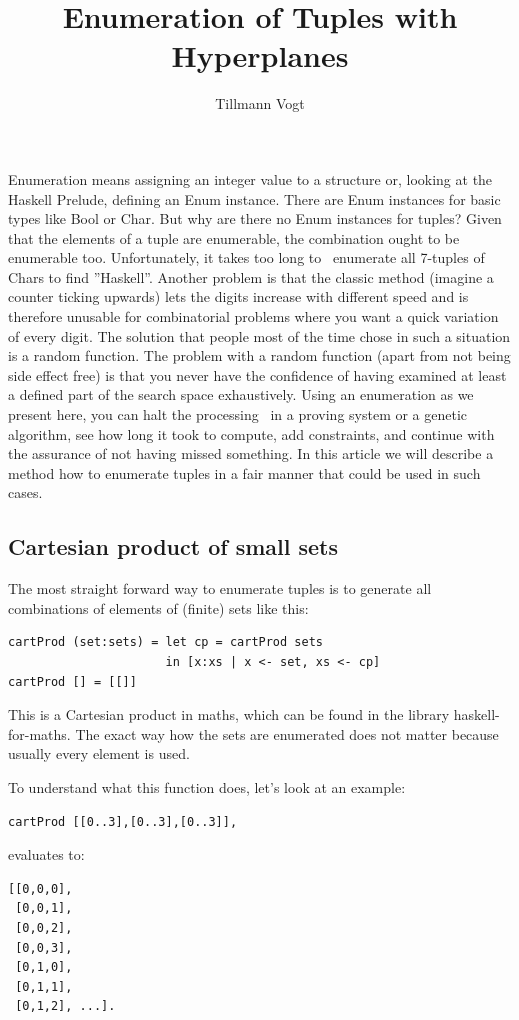 \documentclass{tmr}
\title{Enumeration of Tuples with Hyperplanes} %
\author{Tillmann Vogt\email{tillk.vogt@googlemail.com}}
\begin{document}
\begin{introduction}
Enumeration means assigning an integer value to a structure or, looking at the Haskell Prelude, defining an Enum instance. There are Enum instances for basic types like Bool or Char. But why are there no Enum instances for tuples?  Given that the elements of a tuple are enumerable, the combination ought to be enumerable too. Unfortunately, it takes too long to \eg\ enumerate all 7-tuples of Chars to find ''Haskell''. Another problem is that the classic method (imagine a counter ticking upwards) lets the digits increase with different speed and is therefore unusable for combinatorial problems where you want a quick variation of every digit. The solution that people most of the time chose in such a situation is a random function. The problem with a random function (apart from not being side effect free) is that you never have the confidence of having examined at least a defined part of the search space exhaustively. Using an enumeration as we present here, you can halt the processing \eg\ in a proving system or a genetic algorithm, see how long it took to compute, add constraints, and continue with the assurance of not having missed something. In this article we will describe a method how to enumerate tuples in a fair manner that could be used in such cases.
\end{introduction}

\subsection{Cartesian product of small sets}

The most straight forward way to enumerate tuples is to generate all combinations of elements of (finite) sets like this:
\begin{Verbatim}
cartProd (set:sets) = let cp = cartProd sets
                      in [x:xs | x <- set, xs <- cp]
cartProd [] = [[]]
\end{Verbatim}
This is a Cartesian product in maths, which can be found in the library haskell-for-maths. The exact way how the sets are enumerated does not matter because usually every element is used.

To understand what this function does, let's look at an example:

\begin{Verbatim}
cartProd [[0..3],[0..3],[0..3]],
\end{Verbatim}
evaluates to:
\begin{Verbatim}
[[0,0,0],
 [0,0,1],
 [0,0,2],
 [0,0,3],
 [0,1,0],
 [0,1,1],
 [0,1,2], ...].
\end{Verbatim}
\end{document}
